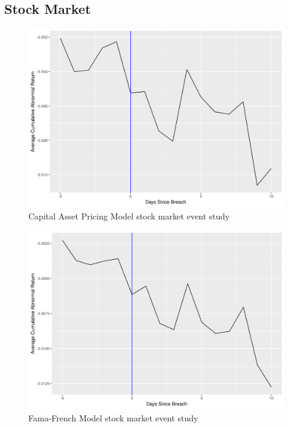 \documentclass[../Main.tex]{subfiles}
\begin{document}
\clearpage
\FloatBarrier

\subsection{Stock Market}

\begin{figure}[!htbp]
    \centering
    \caption{Capital Asset Pricing Model stock market event study}
    \label{capmfig}
    \includegraphics[width=\textwidth]{Images/mmodel_eventstudy.png}
\end{figure}

\FloatBarrier

\begin{figure}[!htbp]
    \centering
    \caption{Fama-French Model stock market event study}
    \label{fffig}
    \includegraphics[width=\textwidth]{Images/ffmodel_eventstudy.png}
\end{figure}
\end{document}
